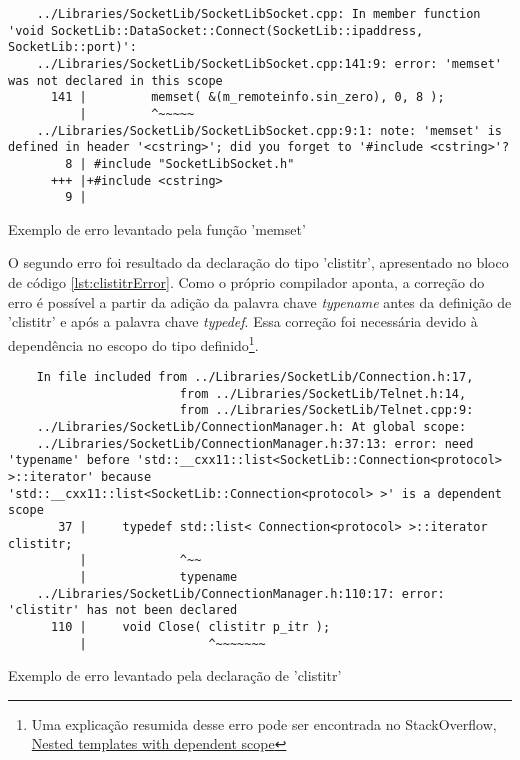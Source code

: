 \begin{listing}[!ht]
    \begin{verbatim}
    ../Libraries/SocketLib/SocketLibSocket.cpp: In member function 'void SocketLib::DataSocket::Connect(SocketLib::ipaddress, SocketLib::port)':
    ../Libraries/SocketLib/SocketLibSocket.cpp:141:9: error: 'memset' was not declared in this scope
      141 |         memset( &(m_remoteinfo.sin_zero), 0, 8 );
          |         ^~~~~~
    ../Libraries/SocketLib/SocketLibSocket.cpp:9:1: note: 'memset' is defined in header '<cstring>'; did you forget to '#include <cstring>'?
        8 | #include "SocketLibSocket.h"
      +++ |+#include <cstring>
        9 | 
    \end{verbatim}
\caption{Exemplo de erro levantado pela função 'memset'}
\label{lst:memsetError}
\end{listing}

O segundo erro foi resultado da declaração do tipo 'clistitr', apresentado no bloco de código \ref{lst:clistitrError}. 
Como o próprio compilador aponta, a correção do erro é possível a partir da adição da 
palavra chave \textit{typename} antes da definição de 'clistitr' e após a palavra chave \textit{typedef}. 
Essa correção foi necessária devido à dependência no escopo do tipo definido\footnote{
    Uma explicação resumida desse erro pode ser encontrada no StackOverflow, \href{https://stackoverflow.com/questions/3311633/nested-templates-with-dependent-scope/3311640\#3311640}{Nested templates with dependent scope}
}.

\begin{listing}[!ht]
    \begin{verbatim}
    In file included from ../Libraries/SocketLib/Connection.h:17,
                        from ../Libraries/SocketLib/Telnet.h:14,
                        from ../Libraries/SocketLib/Telnet.cpp:9:
    ../Libraries/SocketLib/ConnectionManager.h: At global scope:
    ../Libraries/SocketLib/ConnectionManager.h:37:13: error: need 'typename' before 'std::__cxx11::list<SocketLib::Connection<protocol> >::iterator' because 'std::__cxx11::list<SocketLib::Connection<protocol> >' is a dependent scope
       37 |     typedef std::list< Connection<protocol> >::iterator clistitr;
          |             ^~~
          |             typename 
    ../Libraries/SocketLib/ConnectionManager.h:110:17: error: 'clistitr' has not been declared
      110 |     void Close( clistitr p_itr );
          |                 ^~~~~~~~
    \end{verbatim}
\caption{Exemplo de erro levantado pela declaração de 'clistitr'}
\label{lst:clistitrError}
\end{listing}

